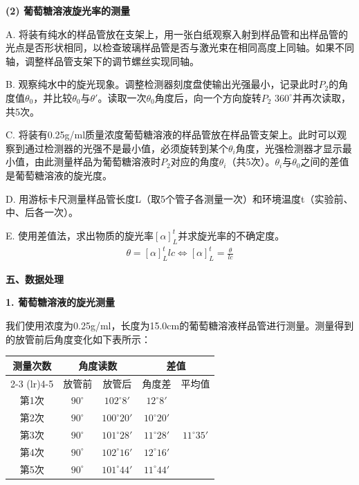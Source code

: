 ﻿\documentclass[12pt,a4paper]{article}
\begin{document}
\textbf{(2) 葡萄糖溶液旋光率的测量}

A. 将装有纯水的样品管放在支架上，用一张白纸观察入射到样品管和出样品管的光点是否形状相同，以检查玻璃样品管是否与激光束在相同高度上同轴。如果不同轴，调整样品管支架下的调节螺丝实现同轴。

B. 观察纯水中的旋光现象。调整检测器刻度盘使输出光强最小，记录此时$P_{2}$的角度值$\theta _{0}$，并比较$\theta _{0}$与${\theta}'$。读取一次$\theta _{0}$角度后，向一个方向旋转$P_{2}$ $360^\circ$并再次读取，共5次。

C. 将装有0.25g/ml质量浓度葡萄糖溶液的样品管放在样品管支架上。此时可以观察到通过检测器的光强不是最小值，必须旋转到某个$\theta _{i}$角度，光强检测器才显示最小值，由此测量样品为葡萄糖溶液时$P_{2}$对应的角度$\theta _{i}$（共5次）。$\theta _{i}$与$\theta _{0}$之间的差值是葡萄糖溶液的旋光度。

D. 用游标卡尺测量样品管长度L（取5个管子各测量一次）和环境温度t（实验前、中、后各一次）。

E. 使用差值法，求出物质的旋光率$\left [ \alpha  \right ] _{L}^{t}$并求旋光率的不确定度。
\begin{eqnarray} 
\theta = \left [ \alpha  \right ] _{L}^{t} lc \Longleftrightarrow \left [ \alpha  \right ] _{L}^{t}=\frac{\theta}{lc} 
\end{eqnarray}

\vspace{0.5cm}
\textbf{五、数据处理}

\textbf{1. 葡萄糖溶液的旋光测量}

我们使用浓度为0.25g/ml，长度为15.0cm的葡萄糖溶液样品管进行测量。测量得到的放管前后角度变化如下表所示：

\begin{center}
    \begin{tabular}{ccccc}
        \toprule
        测量次数 & \multicolumn{2}{c}{角度读数} & \multicolumn{2}{c}{差值} \\
        \cmidrule(lr){2-3} \cmidrule(lr){4-5}
        & 放管前 & 放管后 & 角度差 & 平均值 \\
        \midrule
        第1次 & $90^\circ$ & $102^\circ8'$ & $12^\circ8'$ & \multirow{5}{*}{$11^\circ35'$} \\
        第2次 & $90^\circ$ & $100^\circ20'$ & $10^\circ20'$ & \\
        第3次 & $90^\circ$ & $101^\circ28'$ & $11^\circ28'$ & \\
        第4次 & $90^\circ$ & $102^\circ16'$ & $12^\circ16'$ & \\
        第5次 & $90^\circ$ & $101^\circ44'$ & $11^\circ44'$ & \\
        \bottomrule
    \end{tabular}
\end{center}
\end{document}
